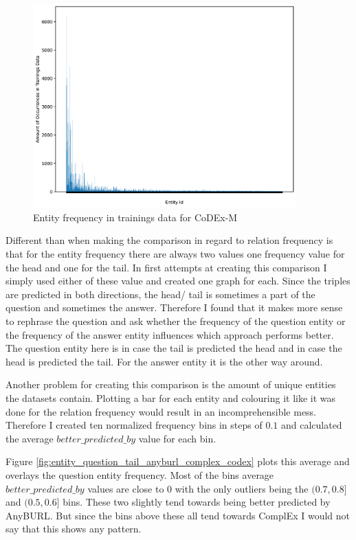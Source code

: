 \begin{figure}[H]
\centering
\includegraphics[width=0.9\textwidth]{images/entity_freq_codex.PNG}
\caption{Entity frequency in trainings data for CoDEx-M}
\label{fig:entity_freq_codex}
\end{figure}

Different than when making the comparison in regard to relation frequency is that for the entity frequency there are always two values one frequency value for the head and one for the tail. In first attempts at creating this comparison I simply used either of these value and created one graph for each. Since the triples are predicted in both directions, the head/ tail is sometimes a part of the question and sometimes the answer. Therefore I found that it makes more sense to rephrase the question and ask whether the frequency of the question entity or the frequency of the answer entity influences which approach performs better. The question entity here is in case the tail is predicted the head and in case the head is predicted the tail. For the answer entity it is the other way around.

Another problem for creating this comparison is the amount of unique entities the datasets contain. Plotting a bar for each entity and colouring it like it was done for the relation frequency would result in an incomprehensible mess. Therefore I created ten normalized frequency bins in steps of $0.1$ and calculated the average $better\_predicted\_by$ value for each bin. 

Figure \ref{fig:entity_question_tail_anyburl_complex_codex} plots this average and overlays the question entity frequency. Most of the bins average $better\_predicted\_by$ values are close to $0$ with the only outliers being the $(0.7, 0.8]$ and $(0.5, 0.6]$ bins. These two slightly tend towards being better predicted by AnyBURL. But since the bins above these all tend towards ComplEx I would not say that this shows any pattern.

